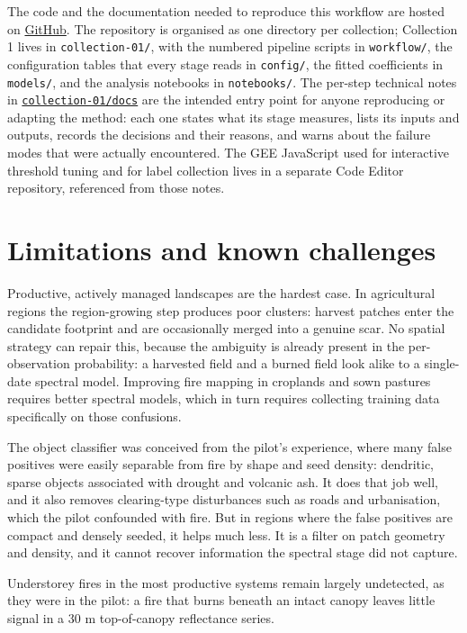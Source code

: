 \documentclass[11pt,a4paper]{article}
\begin{document}
The code and the documentation needed to reproduce this workflow are hosted on
\href{https://github.com/mapbiomas/argentina-fire}{GitHub}. The repository is organised
as one directory per collection; Collection 1 lives in \texttt{collection-01/}, with the numbered
pipeline scripts in \texttt{workflow/}, the configuration tables that every stage reads in
\texttt{config/}, the fitted coefficients in \texttt{models/}, and the analysis notebooks in
\texttt{notebooks/}. The per-step technical notes in
\href{https://github.com/mapbiomas/argentina-fire/tree/main/collection-01/docs}{\texttt{collection-01/docs}}
are the intended entry point for anyone reproducing or adapting the method: each one states what its
stage measures, lists its inputs and outputs, records the decisions and their reasons, and warns
about the failure modes that were actually encountered. The GEE JavaScript used for
interactive threshold tuning and for label collection lives in a separate Code Editor repository,
referenced from those notes.

\section{Limitations and known challenges}

Productive, actively managed landscapes are the hardest case. In agricultural regions the
region-growing step produces poor clusters: harvest patches enter the candidate footprint and are
occasionally merged into a genuine scar. No spatial strategy can repair this, because the ambiguity
is already present in the per-observation probability: a harvested field and a burned field look
alike to a single-date spectral model. Improving fire mapping in croplands and sown pastures
requires better spectral models, which in turn requires collecting training data specifically on
those confusions.

The object classifier was conceived from the pilot's experience, where many false positives were
easily separable from fire by shape and seed density: dendritic, sparse objects associated with
drought and volcanic ash. It does that job well, and it also removes clearing-type disturbances
such as roads and urbanisation, which the pilot confounded with fire. But in regions where the
false positives are compact and densely seeded, it helps much less. It is a filter on patch
geometry and density, and it cannot recover information the spectral stage did not capture.

Understorey fires in the most productive systems remain largely undetected, as they were in the
pilot: a fire that burns beneath an intact canopy leaves little signal in a 30 m top-of-canopy
reflectance series.
\end{document}
